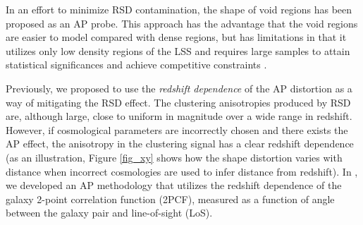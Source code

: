 \documentclass[iop]{emulateapj}
\begin{document}
In an effort to minimize RSD contamination, the shape of void regions \citep{Ryden1995,LavausWandelt1995}  has been 
proposed as an AP probe. This approach has the advantage that the void regions are easier to model compared with dense regions, 
but has limitations in that it utilizes only low density regions of the LSS and requires large samples to attain statistical significances and achieve competitive constraints \citep{Qingqing2016}.


Previously, we proposed to use the {\it redshift dependence} of the AP distortion \citep{Li2014} as a way of mitigating the RSD effect. 
The clustering anisotropies produced by RSD are, although large, close to uniform in magnitude over a wide range in redshift.  
However, if cosmological parameters are incorrectly chosen and there exists the AP effect, 
the anisotropy in the clustering signal has a clear redshift dependence
(as an illustration, Figure \ref{fig_xy} shows how the shape distortion varies with distance 
when incorrect cosmologies are used to infer distance from redshift).
In \cite{Li2015}, we developed an AP methodology 
that utilizes the redshift dependence of the galaxy 2-point correlation function (2PCF), 
measured as a function of angle between the galaxy pair and line-of-sight (LoS).
\end{document}
